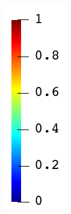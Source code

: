 \begin{figure}[!htb]
\begin{subfigure}{0.04\textwidth}
    \includegraphics[width=\textwidth,scale=0.5]{Chapter5/figures/SFC/colorbar_d_vertical}
    \vspace{1em}
  \end{subfigure}
  

\end{figure}
